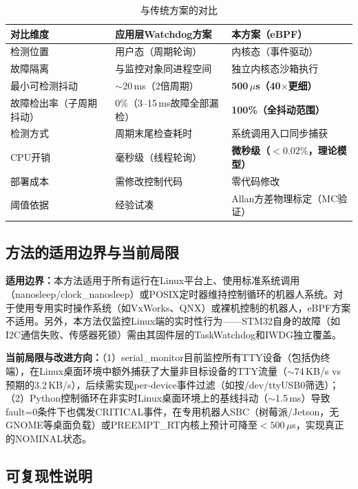 \documentclass{rjthesis}
\begin{document}
\begin{table}[h]
    \centering
    \caption{与传统方案的对比}
    \label{tab:comparison}
    \small
    \begin{tabular}{p{2.8cm} p{3.5cm} p{3.5cm}}
        \toprule
        \textbf{对比维度} & \textbf{应用层Watchdog方案} & \textbf{本方案（eBPF）} \\
        \midrule
        检测位置 & 用户态（周期轮询） & 内核态（事件驱动） \\
        故障隔离 & 与监控对象同进程空间 & 独立内核态沙箱执行 \\
        最小可检测抖动 & $\sim$20\,ms（2倍周期） & \textbf{500\,$\mu$s（40$\times$更细）} \\
        故障检出率（子周期抖动） & 0\%（3--15\,ms故障全部漏检） & \textbf{100\%（全抖动范围）} \\
        检测方式 & 周期末尾检查耗时 & 系统调用入口同步捕获 \\
        CPU开销 & 毫秒级（线程轮询） & \textbf{微秒级（$<0.02\%$，理论模型）} \\
        部署成本 & 需修改控制代码 & 零代码修改 \\
        阈值依据 & 经验试凑 & Allan方差物理标定（MC验证） \\
        \bottomrule
    \end{tabular}
\end{table}

\subsection{方法的适用边界与当前局限}

\textbf{适用边界：}本方法适用于所有运行在Linux平台上、使用标准系统调用（nanosleep/clock\_nanosleep）或POSIX定时器维持控制循环的机器人系统。对于使用专用实时操作系统（如VxWorks、QNX）或裸机控制的机器人，eBPF方案不适用。另外，本方法仅监控Linux端的实时性行为——STM32自身的故障（如I2C通信失败、传感器死锁）需由其固件层的TaskWatchdog和IWDG独立覆盖。

\textbf{当前局限与改进方向：}（1）serial\_monitor目前监控所有TTY设备（包括伪终端），在Linux桌面环境中额外捕获了大量非目标设备的TTY流量（$\sim$74\,KB/s vs 预期的3.2\,KB/s），后续需实现per-device事件过滤（如按/dev/ttyUSB0筛选）；（2）Python控制循环在非实时Linux桌面环境上的基线抖动（$\sim$1.5\,ms）导致fault=0条件下也偶发CRITICAL事件，在专用机器人SBC（树莓派/Jetson，无GNOME等桌面负载）或PREEMPT\_RT内核上预计可降至$<500\,\mu$s，实现真正的NOMINAL状态。

\subsection{可复现性说明}
\end{document}

